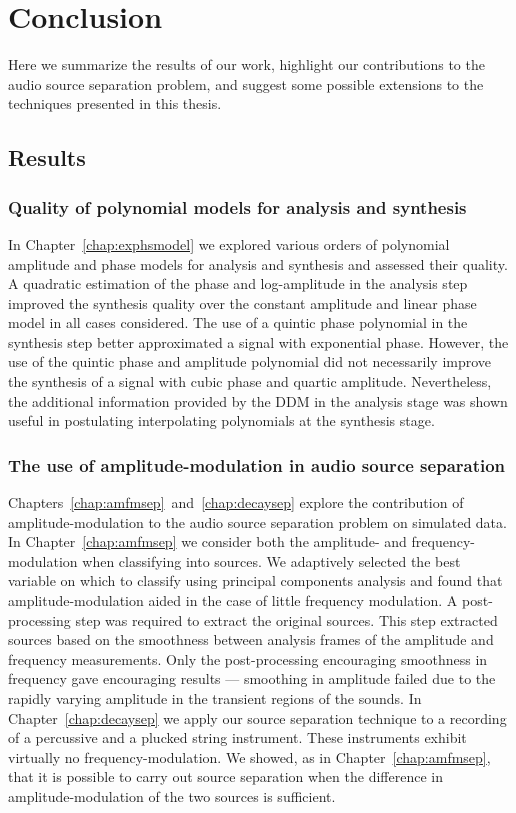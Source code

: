\chapter{Conclusion\label{chap:conclusion}}

Here we summarize the results of our work, highlight our contributions to the
audio source separation problem, and suggest some possible extensions to the
techniques presented in this thesis.

\section{Results}

\subsection{Quality of polynomial models for analysis and synthesis}

In Chapter~\ref{chap:exphsmodel} we explored various orders of polynomial amplitude and
phase models for analysis and synthesis and assessed their quality. A
quadratic estimation of the phase and log-amplitude in the analysis step
improved the synthesis quality over the constant amplitude and linear phase
model in all cases considered. The use of a quintic phase
polynomial in the synthesis step better approximated a signal with exponential
phase. However, the use of the quintic phase and amplitude polynomial did not
necessarily improve the synthesis of a signal with cubic phase and quartic
amplitude. Nevertheless, the additional information provided by the DDM in the
analysis stage was shown useful in postulating interpolating polynomials at the
synthesis stage.

\subsection{The use of amplitude-modulation in audio source separation}

Chapters~\ref{chap:amfmsep}~and~\ref{chap:decaysep} explore the contribution of
amplitude-modulation to the audio source separation problem on simulated data.
In Chapter~\ref{chap:amfmsep} we consider both the amplitude- and
frequency-modulation when classifying into sources. We adaptively selected the
best variable on which to classify using principal components analysis and found
that amplitude-modulation aided in the case of little frequency modulation. A
post-processing step was required to extract the original sources. This step
extracted sources based on the smoothness between analysis frames of the
amplitude and frequency measurements.  Only the post-processing encouraging
smoothness in frequency gave encouraging results --- smoothing in amplitude
failed due to the rapidly varying amplitude in the transient regions of the
sounds. In Chapter~\ref{chap:decaysep} we apply our source separation technique
to a recording of a percussive and a plucked string instrument. These
instruments exhibit virtually no frequency-modulation. We showed, as in
Chapter~\ref{chap:amfmsep}, that it is
possible to carry out source separation when the difference in
amplitude-modulation of the two sources is sufficient. 

